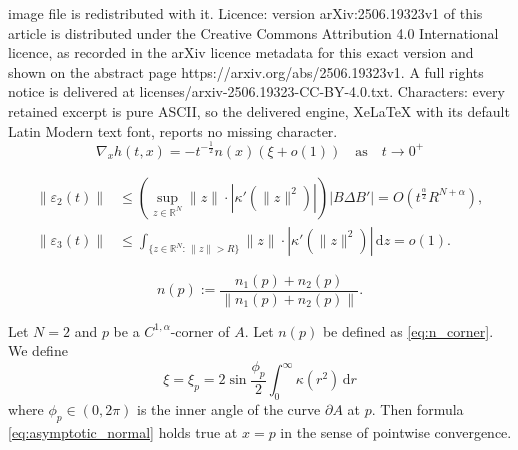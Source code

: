 \documentclass[10pt,a4paper]{amsart}
\newcommand{\R}{\mathbb{R}}  %
\newcommand{\ep}{\varepsilon}
\newcommand{\pp}{p}
\renewcommand{\AA}{A}  %
\renewcommand{\d}{\mathrm{d}}  %
\begin{document}
image file is redistributed with it. Licence: version arXiv:2506.19323v1 of this article is distributed under the Creative Commons Attribution 4.0 International licence, as recorded in the arXiv licence metadata for this exact version and shown on the abstract page https://arxiv.org/abs/2506.19323v1. A full rights notice is delivered at licenses/arxiv-2506.19323-CC-BY-4.0.txt. Characters: every retained excerpt is pure ASCII, so the delivered engine, XeLaTeX with its default Latin Modern text font, reports no missing character.
\begin{equation}\label{eq:asymptotic_normal}
\nabla_x h(t,x) = -  t^{-\frac1{2}}n(x) (\xi + o(1)) \quad  \text{as}\quad t\to 0^+ 
\end{equation}

\begin{align}
\|\ep_2(t)\| &\le \left(\sup_{z \in \R^N  }\|z\| \!\cdot\!  |\kappa'(\|z\|^2)|\right) |B\Delta B'|  =O( t^\frac{\alpha}{2}R^{N+\alpha}), \label{eq:E2} \\ 
\|\ep_3(t)\| &\le \int_{\{z\in\R^N:\,\|z\|>R\}} \|z\|\!\cdot\!  |\kappa'(\|z\|^2)|\,\d z =o(1). \label{eq:E3}
\end{align}

\begin{equation}\label{eq:n_corner}
n(\pp):=\frac{n_1(\pp)+n_2(\pp)}{\|n_1(\pp)+n_2(\pp)\|}. 
\end{equation}

\begin{proposition}\label{Thm:piecewise} 
Let $N=2$ and $\pp$ be a $C^{1,\alpha}$-corner of $\AA$. Let $n(\pp)$ be defined as \eqref{eq:n_corner}. We define
$$
\xi = \xi_\pp = 2\sin \frac{\phi_\pp}{2} \int_0^\infty \kappa(r^2)\,\d r
$$
 where $\phi_p\in (0,2\pi)$ is the inner angle of the curve $\partial \AA$ at $\pp$. Then formula \eqref{eq:asymptotic_normal} holds true at $x=\pp$ in the sense of pointwise convergence. 
 
 \end{proposition}
\end{document}

